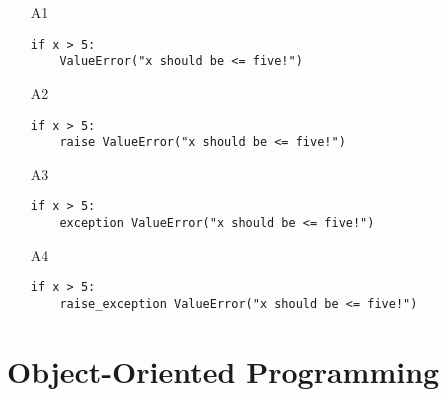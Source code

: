 \begin{enumerate}
\begin{enumerate}
\item[A1] 
\begin{verbatim}
if x > 5:
    ValueError("x should be <= five!")
\end{verbatim}
\item[A2] 
\begin{verbatim}
if x > 5:
    raise ValueError("x should be <= five!")
\end{verbatim}
\item[A3] 
\begin{verbatim}
if x > 5:
    exception ValueError("x should be <= five!")
\end{verbatim}
\item[A4] 
\begin{verbatim}
if x > 5:
    raise_exception ValueError("x should be <= five!")
\end{verbatim}
\end{enumerate}

\vspace{6mm}

\end{enumerate}


\section{Object-Oriented Programming}

